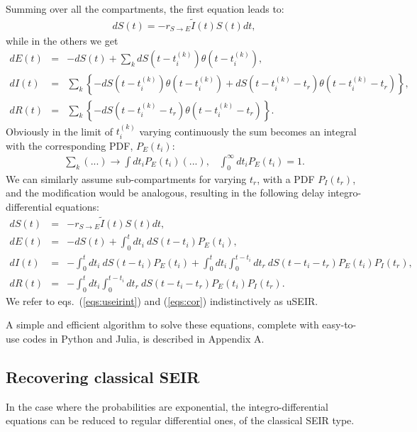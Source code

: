 \documentclass[a4paper,oneside,11pt]{article}
\begin{document}
Summing over all the compartments, the first equation leads to:
\begin{eqnarray}
d S(t) = - r_{S\rightarrow E} \tilde{I}(t) S(t) dt,
\end{eqnarray}
while in the others we get
\begin{eqnarray}
d E(t) &=& -d S(t) + \sum_k d S(t-t^{(k)}_i) \theta(t-t^{(k)}_i) ,\nonumber\\
d I(t) &=& \sum_k  \left\{-d S(t-t^{(k)}_i) \theta(t-t^{(k)}_i)+ d S(t-t^{(k)}_i-t_r) \theta(t-t^{(k)}_i-t_r)\right\},\nonumber\\
d R(t) &=& \sum_k \left\{- d S(t - t^{(k)}_i - t_r) \theta(t-t^{(k)}_i-t_r)\right\}.
\label{eqs:corint}
\end{eqnarray}
Obviously in the limit of $t_i^{(k)}$ varying continuously the sum becomes an integral with the corresponding PDF, $P_E(t_i)$:
\begin{eqnarray}
\sum_k  (...) \rightarrow \int dt_i P_E(t_i) (...), \;\;\; \int_0^\infty dt_i P_E(t_i) = 1.
\end{eqnarray}
We can similarly assume sub-compartments for varying $t_r$, with a PDF $P_I(t_r)$, and the modification would be analogous, resulting in the following delay integro-differential equations:
\begin{eqnarray}
d S(t) &=& - r_{S\rightarrow E} \tilde{I}(t) S(t) dt,\nonumber\\
d E(t) &=& -d S(t) + \int_0^{t} dt_i ~d S(t-t_i) P_E(t_i) ,\nonumber\\
d I(t) &=& -\int_0^{t} dt_i  ~d S(t-t_i) P_E(t_i) + \int_0^{t} d t_i \int_0^{t-t_i} dt_r~ dS(t-t_i-t_r) P_E(t_i) P_I(t_r),\nonumber\\
d R(t) &=& -\int_0^{t} d t_i \int_0^{t-t_i} dt_r~ dS(t-t_i-t_r) P_E(t_i) P_I(t_r).
\label{eqs:useirint}
\end{eqnarray}
We refer to eqs.~(\ref{eqs:useirint}) and (\ref{eqs:cor}) indistinctively as uSEIR.

A simple and efficient algorithm to solve these equations, complete with easy-to-use codes in Python and Julia, is described in Appendix A.




\subsection{Recovering classical SEIR}

In the case where the probabilities are exponential, the integro-differential equations can be reduced to regular differential ones, of the classical SEIR type.
\end{document}
